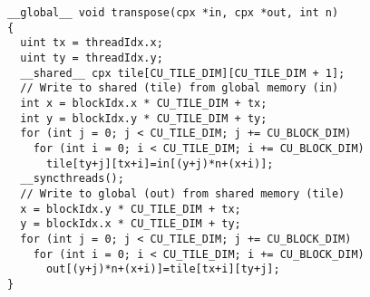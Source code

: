 \lstset{language=C++}
\begin{lstlisting}
__global__ void transpose(cpx *in, cpx *out, int n)
{
  uint tx = threadIdx.x;
  uint ty = threadIdx.y;
  __shared__ cpx tile[CU_TILE_DIM][CU_TILE_DIM + 1];  
  // Write to shared (tile) from global memory (in)
  int x = blockIdx.x * CU_TILE_DIM + tx;
  int y = blockIdx.y * CU_TILE_DIM + ty;
  for (int j = 0; j < CU_TILE_DIM; j += CU_BLOCK_DIM)
    for (int i = 0; i < CU_TILE_DIM; i += CU_BLOCK_DIM)
      tile[ty+j][tx+i]=in[(y+j)*n+(x+i)];
  __syncthreads();
  // Write to global (out) from shared memory (tile)
  x = blockIdx.y * CU_TILE_DIM + tx;
  y = blockIdx.x * CU_TILE_DIM + ty;
  for (int j = 0; j < CU_TILE_DIM; j += CU_BLOCK_DIM)
    for (int i = 0; i < CU_TILE_DIM; i += CU_BLOCK_DIM)
      out[(y+j)*n+(x+i)]=tile[tx+i][ty+j];
}
\end{lstlisting}